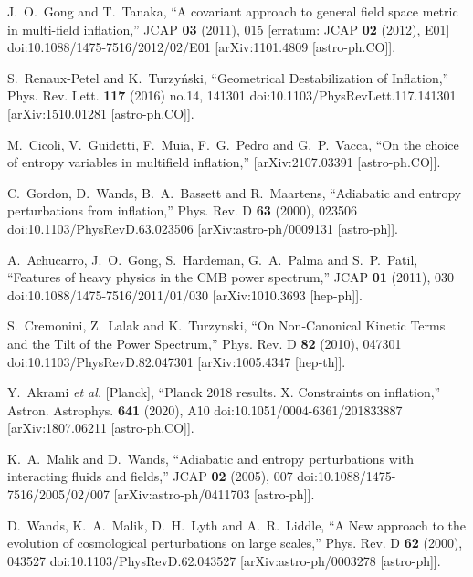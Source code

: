 \documentclass[aps,prd,a4paper,twocolumn,amsmath,showpacs,superscriptaddress,nofootinbib,preprintnumbers]{revtex4-1}
\begin{document}
\begin{thebibliography}{99}
J.~O.~Gong and T.~Tanaka,
``A covariant approach to general field space metric in multi-field inflation,''
JCAP \textbf{03} (2011), 015
[erratum: JCAP \textbf{02} (2012), E01]
doi:10.1088/1475-7516/2012/02/E01
[arXiv:1101.4809 [astro-ph.CO]].

S.~Renaux-Petel and K.~Turzy\'nski,
``Geometrical Destabilization of Inflation,''
Phys. Rev. Lett. \textbf{117} (2016) no.14, 141301
doi:10.1103/PhysRevLett.117.141301
[arXiv:1510.01281 [astro-ph.CO]].

M.~Cicoli, V.~Guidetti, F.~Muia, F.~G.~Pedro and G.~P.~Vacca,
``On the choice of entropy variables in multifield inflation,''
[arXiv:2107.03391 [astro-ph.CO]].

C.~Gordon, D.~Wands, B.~A.~Bassett and R.~Maartens,
``Adiabatic and entropy perturbations from inflation,''
Phys. Rev. D \textbf{63} (2000), 023506
doi:10.1103/PhysRevD.63.023506
[arXiv:astro-ph/0009131 [astro-ph]].

A.~Achucarro, J.~O.~Gong, S.~Hardeman, G.~A.~Palma and S.~P.~Patil,
``Features of heavy physics in the CMB power spectrum,''
JCAP \textbf{01} (2011), 030
doi:10.1088/1475-7516/2011/01/030
[arXiv:1010.3693 [hep-ph]].

S.~Cremonini, Z.~Lalak and K.~Turzynski,
``On Non-Canonical Kinetic Terms and the Tilt of the Power Spectrum,''
Phys. Rev. D \textbf{82} (2010), 047301
doi:10.1103/PhysRevD.82.047301
[arXiv:1005.4347 [hep-th]].

Y.~Akrami \textit{et al.} [Planck],
``Planck 2018 results. X. Constraints on inflation,''
Astron. Astrophys. \textbf{641} (2020), A10
doi:10.1051/0004-6361/201833887
[arXiv:1807.06211 [astro-ph.CO]].

K.~A.~Malik and D.~Wands,
``Adiabatic and entropy perturbations with interacting fluids and fields,''
JCAP \textbf{02} (2005), 007
doi:10.1088/1475-7516/2005/02/007
[arXiv:astro-ph/0411703 [astro-ph]].

D.~Wands, K.~A.~Malik, D.~H.~Lyth and A.~R.~Liddle,
``A New approach to the evolution of cosmological perturbations on large scales,''
Phys. Rev. D \textbf{62} (2000), 043527
doi:10.1103/PhysRevD.62.043527
[arXiv:astro-ph/0003278 [astro-ph]].


\end{thebibliography}
\end{document}
